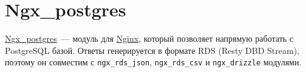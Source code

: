 \section{Ngx\_postgres}

\href{https://github.com/FRiCKLE/ngx\_postgres}{Ngx\_postgres}~--- модуль для \href{https://www.nginx.com/}{Nginx}, который позволяет напрямую работать с PostgreSQL базой. Ответы генерируется в формате RDS (Resty DBD Stream), поэтому он совместим с \lstinline!ngx_rds_json!, \lstinline!ngx_rds_csv! и \lstinline!ngx_drizzle! модулями.
